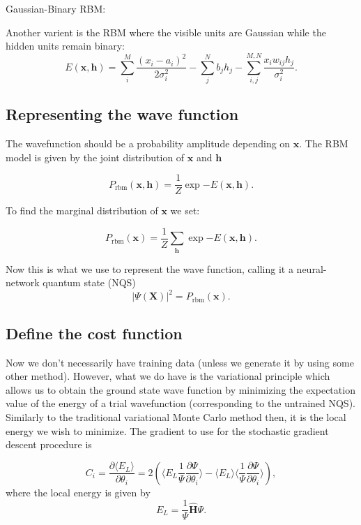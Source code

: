 \documentclass[%
oneside,                 %
final,                   %
10pt]{article}
\begin{document}
\begin{block}{Gaussian-Binary RBM: }

Another varient is the RBM where the visible units are Gaussian while the hidden units remain binary:
\[
	E(\bm{x}, \bm{h}) = \sum_i^M \frac{(x_i - a_i)^2}{2\sigma_i^2} - \sum_j^N b_j h_j - \sum_{i,j}^{M,N} \frac{x_i w_{ij} h_j}{\sigma_i^2}. 
\]
\end{block}

\subsection{Representing the wave function}

The wavefunction should be a probability amplitude depending on
 $\bm{x}$. The RBM model is given by the joint distribution of
 $\bm{x}$ and $\bm{h}$

\[
        P_{\mathrm{rbm}}(\bm{x},\bm{h}) = \frac{1}{Z} \exp{-E(\bm{x},\bm{h})}.
\]

To find the marginal distribution of $\bm{x}$ we set:

\[
        P_{\mathrm{rbm}}(\bm{x}) =\frac{1}{Z}\sum_{\bm{h}} \exp{-E(\bm{x}, \bm{h})}.
\]

Now this is what we use to represent the wave function, calling it a neural-network quantum state (NQS)
\[
        \vert\Psi (\bm{X})\vert^2 = P_{\mathrm{rbm}}(\bm{x}).
\]

\subsection{Define the cost function}

Now we don't necessarily have training data (unless we generate it by
using some other method). However, what we do have is the variational
principle which allows us to obtain the ground state wave function by
minimizing the expectation value of the energy of a trial wavefunction
(corresponding to the untrained NQS). Similarly to the traditional
variational Monte Carlo method then, it is the local energy we wish to
minimize. The gradient to use for the stochastic gradient descent
procedure is

\[
	C_i = \frac{\partial \langle E_L \rangle}{\partial \theta_i}
	= 2(\langle E_L \frac{1}{\Psi}\frac{\partial \Psi}{\partial \theta_i} \rangle - \langle E_L \rangle \langle \frac{1}{\Psi}\frac{\partial \Psi}{\partial \theta_i} \rangle ),
\]
where the local energy is given by
\[
	E_L = \frac{1}{\Psi} \hat{\bm{H}} \Psi.
\]
\end{document}
